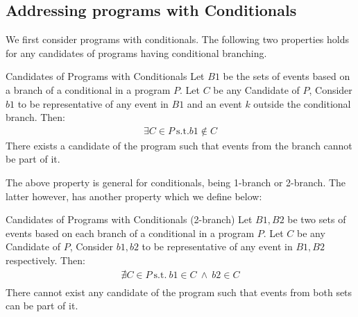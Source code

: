 \subsection{Addressing programs with Conditionals}
        We first consider programs with conditionals. The following two properties holds for any candidates of programs having conditional branching. 

        \begin{property}{Candidates of Programs with Conditionals}
            \label{CondB1}
            Let $B1$ be the sets of events based on a branch of a conditional in a program $P$. Let $C$ be any Candidate of $P$, Consider $b1$ to be representative of any event in $B1$ and an event $k$ outside the conditional branch. Then:
            \begin{align*}
                \exists C \in P \ \text{s.t.} b1 \notin C  
            \end{align*}
            There exists a candidate of the program such that events from the branch cannot be part of it\footnotemark. 
        \end{property}

        The above property is general for conditionals, being 1-branch or 2-branch. The latter however, has another property which we define below:

        \begin{property}{Candidates of Programs with Conditionals (2-branch)}
            \label{CondB2}
            Let $B1,B2$ be two sets of events based on each branch of a conditional in a program $P$. Let $C$ be any Candidate of $P$,  Consider $b1,b2$ to be representative of any event in $B1,B2$ respectively. Then:
            \begin{align*}
                \nexists C \in P \ \text{s.t.} \ b1 \in C \ \wedge \ b2 \in C \\ 
            \end{align*}
            There cannot exist any candidate of the program such that events from both sets can be part of it. 
        \end{property}


